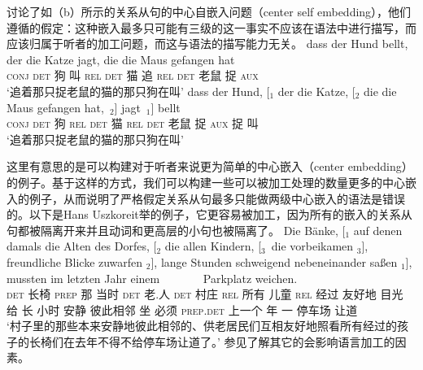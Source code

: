 \citet*{JBR2000a}讨论了如（b）所示的关系从句的中心自嵌入问题（center self embedding），他们遵循\citet[]{CM63a}的假定：这种嵌入最多只可能有三级的这一事实不应该在语法中进行描写，而应该归属于听者的加工问题，而这与语法的描写能力无关。
\eal
\label{TAG-Beispiel-Performanz}
\ex 
\gll dass der Hund bellt, der  die Katze jagt,  die  die Maus  gefangen hat\\
     \textsc{conj} \textsc{det} 狗  叫  \textsc{rel} \textsc{det} 猫 追 \textsc{rel} \textsc{det} 老鼠 捉 \textsc{aux}   \\
\glt `追着那只捉老鼠的猫的那只狗在叫'
\ex 
\gll dass der Hund, [$_1$ der  die Katze, [$_2$ die  die Maus  gefangen hat,~$_2$] jagt~$_1$] bellt\\
     \textsc{conj} \textsc{det} 狗  {}  \textsc{rel} \textsc{det} 猫 {} \textsc{rel} \textsc{det} 老鼠 捉 \textsc{aux}   捉 叫 \\
\glt `追着那只捉老鼠的猫的那只狗在叫'
\zl

\noindent
这里有意思的是可以构建对于听者来说更为简单的中心嵌入（center embedding）的例子。基于这样的方式，我们可以构建一些可以被加工处理的数量更多的中心嵌入的例子，从而说明了严格假定关系从句最多只能做两级中心嵌入的语法是错误的。以下是Hans Uszkoreit举的例子，它更容易被加工，因为所有的嵌入的关系从句都被隔离开来并且动词和更高层的小句也被隔离了。
\ea
\gll Die Bänke, [$_1$ auf denen damals die Alten des Dorfes, [$_2$ die allen Kindern, [$_3$~die vorbeikamen $_3$], freundliche Blicke zuwarfen $_2$], 
lange Stunden schweigend nebeneinander saßen $_1$], mussten im letzten Jahr einem~~~~~~~ Parkplatz weichen.\\
\textsc{det} 长椅 {} \textsc{prep} 那 当时 \textsc{det} 老.人 \textsc{det} 村庄 {} \textsc{rel} 所有 儿童 \hspaceThis{[$_3$~}\textsc{rel} 经过 {} 友好地 目光 给 {}
长 小时 安静 彼此相邻 坐 {} 必须 \textsc{prep}.\textsc{det} 上一个 年 一 停车场 让道\\
\glt `村子里的那些本来安静地彼此相邻的、供老居民们互相友好地照看所有经过的孩子的长椅们在去年不得不给停车场让道了。'
\z
参见了解其它的会影响语言加工的因素。

